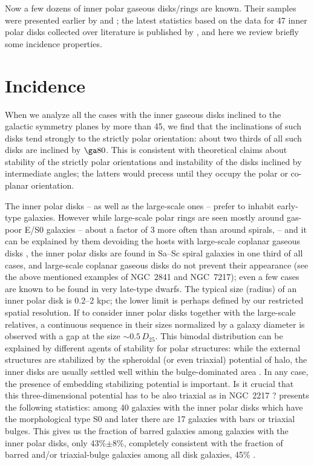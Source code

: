 \documentclass[11pt,twoside]{article}
\begin{document}
Now a few dozens of inner polar gaseous disks/rings are known. Their samples were presented
earlier by \citet{corsini03} and \citet*{moiseev_malta}; the latest statistics based on the data
for 47 inner polar disks collected over literature is published by \citet{mois_rev},
and here we review briefly some incidence properties.

\section{Incidence}

When we analyze all the cases with the inner gaseous disks inclined to the galactic symmetry
planes by more than 45\deg, we find that the inclinations of such disks tend strongly to the
strictly polar orientation: about two thirds of all such disks are inclined by $\ga 80$\deg.
This is consistent with theoretical claims about stability of the strictly polar orientations
and instability of the disks inclined by intermediate angles; the latters would precess until
they occupy the polar or co-planar orientation.

The inner polar disks -- as well as the large-scale ones -- prefer to inhabit early-type
galaxies. However while large-scale polar rings are seen mostly around gas-poor E/S0 galaxies --
about a factor of 3 more often than around spirals, -- and it can be explained by them
devoiding the hosts with large-scale coplanar gaseous disks \citep{resh11}, the inner polar disks
are found in Sa--Sc spiral galaxies in one third of all cases, and large-scale coplanar
gaseous disks do not prevent their appearance (see the above mentioned examples of NGC~2841 and
NGC~7217); even a few cases are known to be found in very late-type dwarfs. The typical size
(radius) of an inner polar disk is 0.2--2 kpc; the lower limit is perhaps defined by our
restricted spatial resolution. If to consider inner polar disks together with the
large-scale relatives, a continuous sequence in their sizes normalized by a galaxy diameter is 
observed with a gap at the  size $\sim0.5\,D_{25}$. This bimodal distribution can be explained by
different agents of stability for polar structures: while the external structures are stabilized
by the spheroidal (or even triaxial) potential of halo, the inner disks are usually settled well 
within the bulge-dominated area \citep{SmirnovaMoiseev2013}.  In any case, the presence of 
embedding stabilizing potential
is important. Is it crucial that this three-dimensional potential has to be also triaxial 
as in NGC~2217 \citep{bettoni90}? \citet{mois_rev} presents the following statistics:
among 40 galaxies with the inner polar disks which have the morphological type S0 and later
there are 17 galaxies with bars or triaxial bulges. This gives us the fraction of barred
galaxies among galaxies with the inner polar disks, only 43\%$\pm$8\%, completely consistent
with the fraction of barred and/or triaxial-bulge galaxies among all disk galaxies, 45\%
\citep*{aguerri09}.
\end{document}
